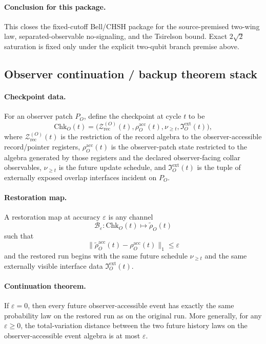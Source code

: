 \documentclass[11pt]{article}
\begin{document}
\paragraph{Conclusion for this package.}
This closes the fixed-cutoff Bell/CHSH package for the source-premised two-wing law,
separated-observable no-signaling, and the Tsirelson bound. Exact \(2\sqrt2\) saturation is
fixed only under the explicit two-qubit branch premise above.

\subsection{Observer continuation / backup theorem stack}

\paragraph{Checkpoint data.}
For an observer patch $P_O$, define the checkpoint at cycle $t$ to be
\begin{equation}
\mathrm{Chk}_O(t)
=
\bigl(
\mathcal Z_{\mathrm{rec}}^{(O)}(t),
\rho_O^{\mathrm{acc}}(t),
\nu_{\ge t},
\mathfrak I_O^{\mathrm{ext}}(t)
\bigr),
\end{equation}
where $\mathcal Z_{\mathrm{rec}}^{(O)}(t)$ is the restriction of the record algebra to the
observer-accessible record/pointer registers, $\rho_O^{\mathrm{acc}}(t)$ is the observer-patch
state restricted to the algebra generated by those registers and the declared observer-facing
collar observables, $\nu_{\ge t}$ is the future update schedule, and
$\mathfrak I_O^{\mathrm{ext}}(t)$ is the tuple of externally exposed overlap interfaces incident
on $P_O$.

\paragraph{Restoration map.}
A restoration map at accuracy $\varepsilon$ is any channel
\begin{equation}
\mathcal B_\varepsilon:\mathrm{Chk}_O(t)\longmapsto \widetilde \rho_O(t)
\end{equation}
such that
\begin{equation}
\bigl\|
\widetilde \rho_O^{\mathrm{acc}}(t)-\rho_O^{\mathrm{acc}}(t)
\bigr\|_1
\le \varepsilon
\end{equation}
and the restored run begins with the same future schedule $\nu_{\ge t}$ and the same externally
visible interface data $\mathfrak I_O^{\mathrm{ext}}(t)$.

\paragraph{Continuation theorem.}
If $\varepsilon=0$, then every future observer-accessible event has exactly the same probability
law on the restored run as on the original run. More generally, for any $\varepsilon\ge 0$, the
total-variation distance between the two future history laws on the observer-accessible event
algebra is at most $\varepsilon$.
\end{document}
